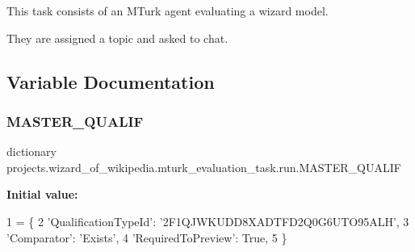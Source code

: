 \begin{DoxyVerb}This task consists of an MTurk agent evaluating a wizard model.

They are assigned a topic and asked to chat.
\end{DoxyVerb}
 

\subsection{Variable Documentation}
\mbox{\label{namespaceprojects_1_1wizard__of__wikipedia_1_1mturk__evaluation__task_1_1run_ad641335aba4eaadc1b11538d063449f3}} 
\subsubsection{\texorpdfstring{M\+A\+S\+T\+E\+R\+\_\+\+Q\+U\+A\+L\+IF}{MASTER\_QUALIF}}
{\footnotesize\ttfamily dictionary projects.\+wizard\+\_\+of\+\_\+wikipedia.\+mturk\+\_\+evaluation\+\_\+task.\+run.\+M\+A\+S\+T\+E\+R\+\_\+\+Q\+U\+A\+L\+IF}

{\bfseries Initial value\+:}
\begin{DoxyCode}
1 =  \{
2     \textcolor{stringliteral}{'QualificationTypeId'}: \textcolor{stringliteral}{'2F1QJWKUDD8XADTFD2Q0G6UTO95ALH'},
3     \textcolor{stringliteral}{'Comparator'}: \textcolor{stringliteral}{'Exists'},
4     \textcolor{stringliteral}{'RequiredToPreview'}: \textcolor{keyword}{True},
5 \}
\end{DoxyCode}
